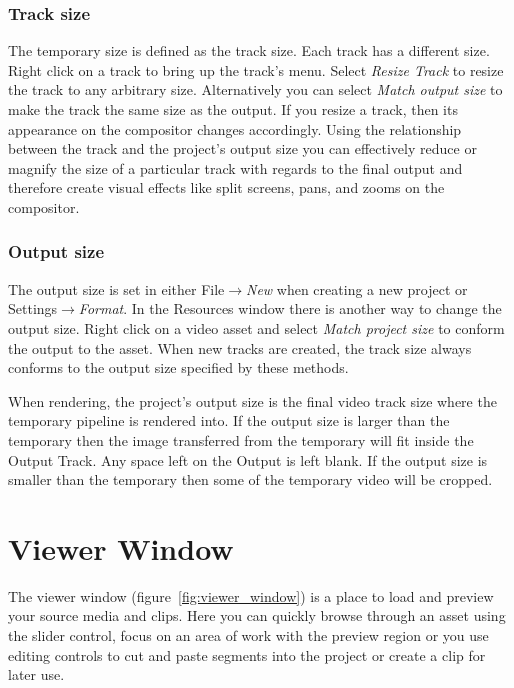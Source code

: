 \subsubsection*{Track size}%
\label{ssub:track_size}

The temporary size is defined as the track size. 
Each track has a different size. 
Right click on a track to bring up the track's menu. 
Select \emph{Resize Track} to resize the track to any arbitrary size. 
Alternatively you can select \emph{Match output size} to make the track the same size as the output. 
If you resize a track, then its appearance on the compositor changes accordingly. 
Using the relationship between the track and the project's output size you can effectively reduce or magnify the size of a particular track with regards to the final output and therefore create visual effects like split screens, pans, and zooms on the compositor.

\subsubsection*{Output size}%
\label{ssub:output_size}


The output size is set in either File$\rightarrow$\emph{New} when creating a new project or Settings$\rightarrow$\emph{Format}. 
In the Resources window there is another way to change the output size. 
Right click on a video asset and select \emph{Match project size} to conform the output to the asset. 
When new tracks are created, the track size always conforms to the output size specified by these methods.

When rendering, the project's output size is the final video track size where the temporary pipeline is rendered into.  
If the output size is larger than the temporary then the image transferred from the temporary will fit inside the Output Track. 
Any space left on the Output is left blank.  
If the output size is smaller than the temporary then some of the temporary video will be cropped.

\section{Viewer Window}%
\label{sec:viewer_window}

The viewer window (figure~\ref{fig:viewer_window}) is a place to load and preview your source media and clips.  
Here you can quickly browse through an asset using the slider control, focus on an area of work with the preview region or you use editing controls to cut and paste segments into the project or create a clip for later use.

